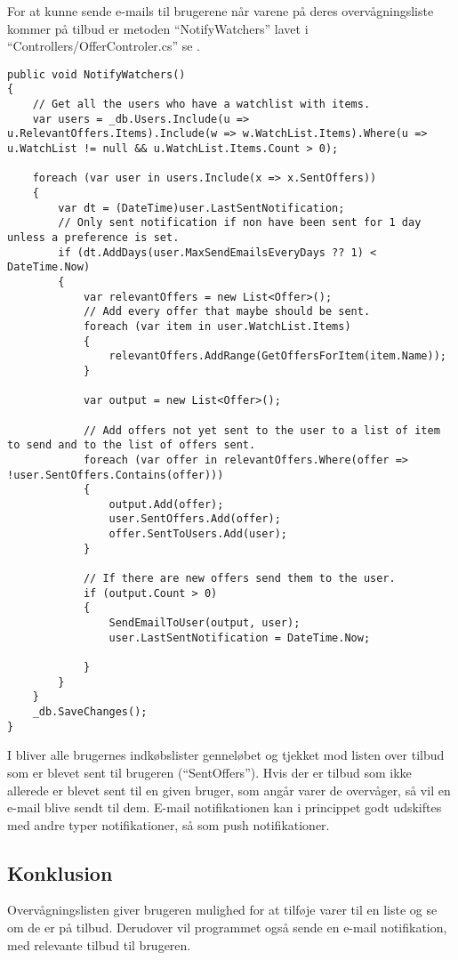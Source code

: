 For at kunne sende e-mails til brugerene når varene på deres overvågningsliste kommer på tilbud er metoden ``NotifyWatchers'' lavet i ``Controllers/OfferControler.cs'' se . 
\begin{lstlisting}[caption="Metoden ``NotifyWatcher som finder de tilbud som skal sendes til hver user og sender dem.''",label=notifywatcherlisting]
public void NotifyWatchers()
{
    // Get all the users who have a watchlist with items.
    var users = _db.Users.Include(u => u.RelevantOffers.Items).Include(w => w.WatchList.Items).Where(u => u.WatchList != null && u.WatchList.Items.Count > 0);

    foreach (var user in users.Include(x => x.SentOffers))
    {
        var dt = (DateTime)user.LastSentNotification;
        // Only sent notification if non have been sent for 1 day unless a preference is set.
        if (dt.AddDays(user.MaxSendEmailsEveryDays ?? 1) < DateTime.Now)
        {
            var relevantOffers = new List<Offer>();
            // Add every offer that maybe should be sent. 
            foreach (var item in user.WatchList.Items)
            {
                relevantOffers.AddRange(GetOffersForItem(item.Name));
            }

            var output = new List<Offer>();

            // Add offers not yet sent to the user to a list of item to send and to the list of offers sent.
            foreach (var offer in relevantOffers.Where(offer => !user.SentOffers.Contains(offer)))
            {
                output.Add(offer);
                user.SentOffers.Add(offer);
                offer.SentToUsers.Add(user);
            }

            // If there are new offers send them to the user.
            if (output.Count > 0)
            {
                SendEmailToUser(output, user);
                user.LastSentNotification = DateTime.Now;

            }
        }
    }
    _db.SaveChanges();
}
\end{lstlisting}
I  bliver alle brugernes indkøbslister genneløbet og tjekket mod listen over tilbud som er blevet sent til brugeren (``SentOffers''). 
Hvis der er tilbud som ikke allerede er blevet sent til en given bruger, som angår varer de overvåger, så vil en e-mail blive sendt til dem. 
E-mail notifikationen kan i princippet godt udskiftes med andre typer notifikationer, så som push notifikationer. %
\subsection{Konklusion}
Overvågningslisten giver brugeren mulighed for at tilføje varer til en liste og se om de er på tilbud. 
Derudover vil programmet også sende en e-mail notifikation, med relevante tilbud til brugeren. 
